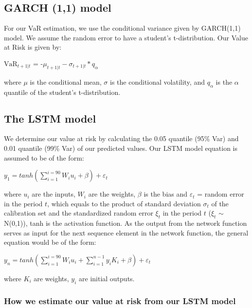 \documentclass[a4paper,11pt,oneside]{book}
\begin{document}
\subsection{GARCH (1,1) model}

For our VaR estimation, we use the conditional variance given by GARCH(1,1) model. We assume the random error to have a student’s t-distribution. Our Value at Risk is given by:
\begin{center}
$\text{VaR}_{t+1|t}$ = -$\mu_{t+1|t} - \sigma_{t+1|t} * q_{\alpha}$
\end{center}
where $\mu$ is the conditional mean, $\sigma$ is the conditional volatility, and $q_{\alpha}$ is the $\alpha$ quantile of the student's t-distribution.

\subsection{The LSTM model}
We determine our value at risk by calculating the 0.05 quantile (95\% Var) and 0.01 quantile (99\% Var) of our predicted values. Our LSTM model equation is assumed to be of the form:
\begin{center}
	$y_1= tanh(\sum_{i=1}^{i=90}W_{i}u_{i}+\beta)+\varepsilon_t$
\end{center} 

where $u_{i}$ are the inputs, $W_i$ are the weights, $\beta$ is the bias and $\varepsilon_t$ = random error in the period $t$, which equals to the
product of standard deviation $\sigma_t$ of the calibration set and  the
standardized random error $\xi_t$ in the period $t$ ($\xi_t$ $\sim$ N(0,1)), tanh is the activation function. As the output from the network function serves as input for the next sequence element in the network function, the general equation would be of the form:

\begin{center}
	$y_n= tanh(\sum_{i=1}^{i=90}W_{i}u_{i}+\sum_{i=1}^{n-1}y_{i}K_{i}+\beta)+\varepsilon_t$
\end{center} 
where $K_i$ are weights, $y_i$ are initial outputs.\newline

\subsubsection{How we estimate our value at risk from our LSTM model}
\end{document}
